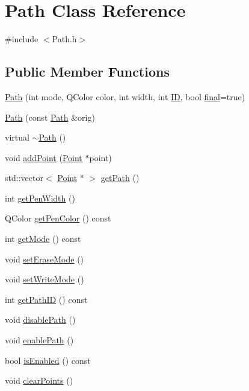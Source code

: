 \hypertarget{classPath}{
\section{Path Class Reference}
\label{classPath}
}


{\ttfamily \#include $<$Path.h$>$}\subsection*{Public Member Functions}
\begin{DoxyCompactItemize}
\item 
\hyperlink{classPath_a5bf647496429909133e8f4f224f8f882}{Path} (int mode, QColor color, int width, int \hyperlink{classPath_a5c1880b5bc26ef03c335687c6edd7921}{ID}, bool \hyperlink{classPath_a657da9ea45a6b01a77c7b5442cace564}{final}=true)
\item 
\hyperlink{classPath_a5e77b7ba66269d687e0f42a41088fc82}{Path} (const \hyperlink{classPath}{Path} \&orig)
\item 
virtual \hyperlink{classPath_a141da9ff89c85e0ba410b5a73864c267}{$\sim$Path} ()
\item 
void \hyperlink{classPath_a1610bba846616d5109fb505fdf902298}{addPoint} (\hyperlink{classPoint}{Point} $\ast$point)
\item 
std::vector$<$ \hyperlink{classPoint}{Point} $\ast$ $>$ \hyperlink{classPath_a0ef674b3f5c9c7d2f2b5b210fa54d7e9}{getPath} ()
\item 
int \hyperlink{classPath_a148b0baa2335d7e6f8a8d608c4ed5be7}{getPenWidth} ()
\item 
QColor \hyperlink{classPath_ab1e4f5182ce9a25cd2efddc0d0e0c3da}{getPenColor} () const 
\item 
int \hyperlink{classPath_a8735925feeee073c98906c0d8dd00397}{getMode} () const 
\item 
void \hyperlink{classPath_a20a988490d9fbf277de8b7c773be9925}{setEraseMode} ()
\item 
void \hyperlink{classPath_a0c95b3ec75c14f0683db1a3894240ad7}{setWriteMode} ()
\item 
int \hyperlink{classPath_ac249bd9daa1240c74ad2f3d57dd94d28}{getPathID} () const 
\item 
void \hyperlink{classPath_acb7454dd8e4b007f93b11042fb5fe025}{disablePath} ()
\item 
void \hyperlink{classPath_a4d622d8253416598cafe0a787a84e9e7}{enablePath} ()
\item 
bool \hyperlink{classPath_a5ea27f57363b51a7f6b6d90dc2d424bb}{isEnabled} () const 
\item 
void \hyperlink{classPath_af70e0919d6eb3319a883ad7a28ac13cc}{clearPoints} ()
\end{DoxyCompactItemize}
